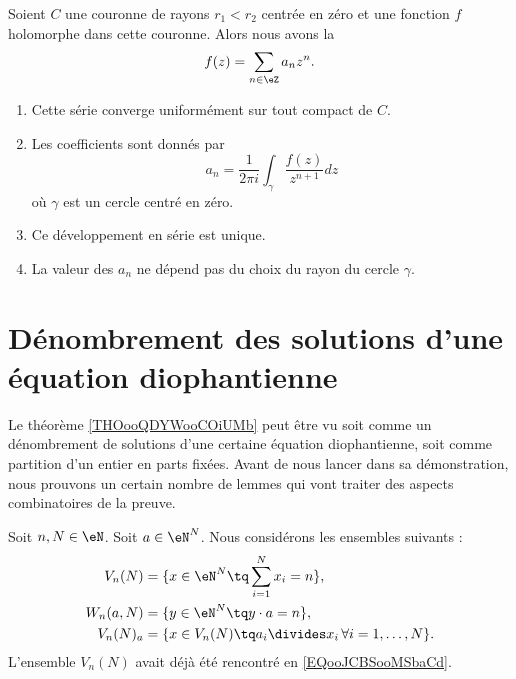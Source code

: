\begin{theorem}       \label{THOooMKJOooVghZyG}
    Soient \( C\) une couronne de rayons \( r_1<r_2\) centrée en zéro et une fonction \( f\) holomorphe dans cette couronne. Alors nous avons la 
    \begin{equation}
        f(z)=\sum_{n\in \eZ}a_nz^n.
    \end{equation}
    \begin{enumerate}
        \item
            Cette série converge uniformément sur tout compact de \( C\).
        \item
            Les coefficients sont donnés par
            \begin{equation}
                a_n=\frac{1}{ 2\pi i }\int_{\gamma}\frac{ f(z) }{ z^{n+1} }dz
            \end{equation}
            où \( \gamma\) est un cercle centré en zéro.
        \item
            Ce développement en série est unique.
        \item
            La valeur des \( a_n\) ne dépend pas du choix du rayon du cercle \( \gamma\).
    \end{enumerate}
\end{theorem}


\section{Dénombrement des solutions d'une équation diophantienne}

Le théorème \ref{THOooQDYWooCOiUMb} peut être vu soit comme un dénombrement de solutions d'une certaine équation diophantienne, soit comme partition d'un entier en parts fixées. Avant de nous lancer dans sa démonstration, nous prouvons un certain nombre de lemmes qui vont traiter des aspects combinatoires de la preuve.

Soit \( n,N\in \eN\). Soit \( a\in \eN^N\). Nous considérons les ensembles suivants :
\begin{subequations}
    \begin{align}
    V_n(N)&=\{ x\in \eN^N\tq \sum_{i=1}^Nx_i=n \}, \\
    W_n(a,N)&=\{ y\in \eN^N\tq y\cdot a=n \},\\
    V_n(N)_a&=\{ x\in V_n(N)\tq a_i\divides x_i\,\forall i=1,\ldots, N \}.
    \end{align}
\end{subequations}
L'ensemble \( V_n(N)\) avait déjà été rencontré en \eqref{EQooJCBSooMSbaCd}.

